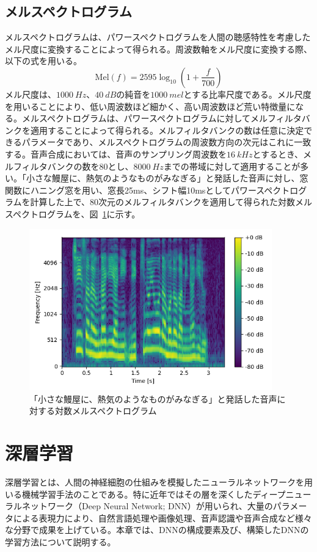 \documentclass[12pt]{jarticle}
\numberwithin{equation}{section}    %
\numberwithin{figure}{section}      %
\numberwithin{table}{section}      %
\begin{document}
\subsection{メルスペクトログラム}
メルスペクトログラムは、パワースペクトログラムを人間の聴感特性を考慮したメル尺度に変換することによって得られる。周波数軸をメル尺度に変換する際、以下の式を用いる。
\begin{equation}
    \text{Mel}(f) = 2595\log_{10} \left(1 + \frac{f}{700}\right)
\end{equation}
メル尺度は、$\SI[]{1000}{Hz}$、$\SI[]{40}{dB}$の純音を$\SI[]{1000}{mel}$とする比率尺度である。メル尺度を用いることにより、低い周波数ほど細かく、高い周波数ほど荒い特徴量になる。メルスペクトログラムは、パワースペクトログラムに対してメルフィルタバンクを適用することによって得られる。メルフィルタバンクの数は任意に決定できるパラメータであり、メルスペクトログラムの周波数方向の次元はこれに一致する。音声合成においては、音声のサンプリング周波数を$\SI[]{16}{kHz}$とするとき、メルフィルタバンクの数を80とし、$\SI[]{8000}{Hz}$までの帯域に対して適用することが多い。「小さな鰻屋に、熱気のようなものがみなぎる」と発話した音声に対し、窓関数にハニング窓を用い、窓長25ms、シフト幅10msとしてパワースペクトログラムを計算した上で、80次元のメルフィルタバンクを適用して得られた対数メルスペクトログラムを、図~\ref{sec2:fig:melspectrogram}に示す。
\begin{figure}[bt]
    \centering
    \includegraphics[height=70mm]{./figure/sec2/melspectrogram.png}
    \caption{「小さな鰻屋に、熱気のようなものがみなぎる」と発話した音声に対する対数メルスペクトログラム}
    \label{sec2:fig:melspectrogram}
\end{figure}

\clearpage

\section{深層学習}
深層学習とは、人間の神経細胞の仕組みを模擬したニューラルネットワークを用いる機械学習手法のことである。特に近年ではその層を深くしたディープニューラルネットワーク（Deep Neural Network; DNN）が用いられ、大量のパラメータによる表現力により、自然言語処理や画像処理、音声認識や音声合成など様々な分野で成果を上げている。本章では、DNNの構成要素及び、構築したDNNの学習方法について説明する。
\end{document}
